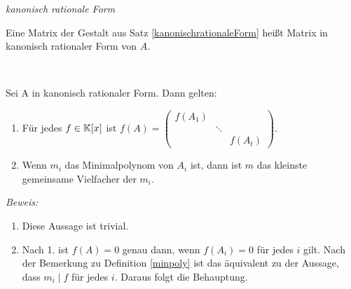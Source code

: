 
\begin{mydef} \textit{kanonisch rationale Form}

    Eine Matrix der Gestalt aus Satz \ref{kanonischrationaleForm} heißt Matrix in kanonisch rationaler Form von $A$.
\end{mydef}


\begin{mylemma}\label{lem3.10}\ 

    Sei A in kanonisch rationaler Form. Dann gelten:
    \begin{enumerate}
        \item \label{lem3.10.2} Für jedes $f \in \mathbb{K}[x]$ ist $f(A) = \begin{pmatrix} f(A_1) & & \\ & \ddots & \\ & & f(A_t) \end{pmatrix} $.
        \item Wenn $m_i$ das Minimalpolynom von $A_i$ ist, dann ist $m$ das kleinste gemeinsame Vielfacher der $m_i$.
    \end{enumerate}

    \textit{Beweis:}
    \begin{enumerate}
        \item Diese Aussage ist trivial.
        \item Nach 1. ist $f(A) = 0$ genau dann, wenn $f(A_i) = 0$ für jedes $i$ gilt. 
        Nach der Bemerkung zu Definition \ref{minpoly} ist das äquivalent zu der Aussage, dass $m_i \mid f$ für jedes $i$. Daraus folgt die Behauptung.
    \end{enumerate}
\end{mylemma}


